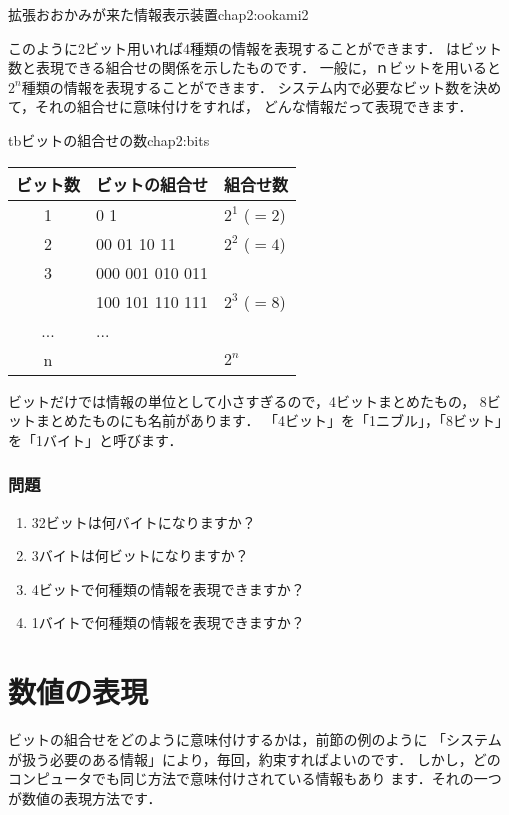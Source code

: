           {拡張おおかみが来た情報表示装置}{chap2:ookami2}

このように2ビット用いれば4種類の情報を表現することができます．
はビット数と表現できる組合せの関係を示したものです．
一般に，ｎビットを用いると$2^n$種類の情報を表現することができます．
システム内で必要なビット数を決めて，それの組合せに意味付けをすれば，
どんな情報だって表現できます．

\begin{mytable}{tb}{ビットの組合せの数}{chap2:bits}
{\small\begin{tabular}{c|l|l} \hline\hline
ビット数 & \multicolumn{1}{c|}{ビットの組合せ} & 組合せ数\\
\hline
1 & 0 1   & $2^1$ ($=2$) \\
2 & 00 01 10 11 & $2^2$ ($=4$) \\
3 & 000 001 010 011 &   \\
  & 100 101 110 111 & $2^3$ ($=8$) \\
...& ... &\\
n &  & $2^n$ \\
\end{tabular}}
\end{mytable}

ビットだけでは情報の単位として小さすぎるので，4ビットまとめたもの，
8ビットまとめたものにも名前があります．
「4ビット」を「1ニブル」，「8ビット」を「1バイト」と呼びます．

\subsubsection{問題}
\begin{enumerate}
\item 32ビットは何バイトになりますか？
\item 3バイトは何ビットになりますか？
\item 4ビットで何種類の情報を表現できますか？
\item 1バイトで何種類の情報を表現できますか？
\end{enumerate}

\newpage
\section{数値の表現}

ビットの組合せをどのように意味付けするかは，前節の例のように
「システムが扱う必要のある情報」により，毎回，約束すればよいのです．
しかし，どのコンピュータでも同じ方法で意味付けされている情報もあり
ます．それの一つが数値の表現方法です．

